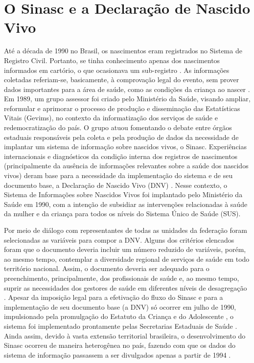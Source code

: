 \section{O Sinasc e a Declaração de Nascido Vivo}

Até a década de 1990 no Brasil, os nascimentos eram registrados no Sistema de Registro Civil. Portanto, se tinha conhecimento apenas dos nascimentos informados em cartório, o que ocasionava um sub-registro \cite{silvestrin2018avaliaccao}. As informações coletadas referiam-se, basicamente, à comprovação legal do evento, sem prover dados importantes para a área de saúde, como as condições da criança ao nascer \cite{szwarcwald2019evaluation}. Em 1989, um grupo assessor foi criado pelo Ministério da Saúde, visando ampliar, reformular e aprimorar o processo de produção e disseminação das Estatísticas Vitais (Gevims), no contexto da informatização dos serviços de saúde e redemocratização do país. O grupo atuou fomentando o debate entre órgãos estaduais responsáveis pela coleta e pela produção de dados da necessidade de implantar um sistema de informação sobre nascidos vivos, o Sinasc. Experiências internacionais e diagnósticos da condição interna dos registros de nascimentos (principalmente da ausência de informações relevantes sobre a saúde dos nascidos vivos) deram base para a necessidade da implementação do sistema e de seu documento base, a Declaração de Nascido Vivo (DNV) \cite{MSsinasc2009}. Nesse contexto, o Sistema de Informações sobre Nascidos Vivos foi implantado pelo Ministério da Saúde em 1990, com a intenção de subsidiar as intervenções relacionadas à saúde da mulher e da criança para todos os níveis do Sistema Único de Saúde (SUS). 

Por meio de diálogo com representantes de todas as unidades da federação foram selecionadas as variáveis para compor a DNV. Alguns dos critérios elencados foram que o documento deveria incluir um número reduzido de variáveis, porém, ao mesmo tempo, contemplar a diversidade regional de serviços de saúde em todo território nacional. Assim, o documento deveria ser adequado para o preenchimento, principalmente, dos profissionais de saúde e, ao mesmo tempo, suprir as necessidades dos gestores de saúde em diferentes níveis de desagregação \cite{MSsinasc2009}. Apesar da imposição legal para a efetivação do fluxo do Sinasc e para a implementação de seu documento base (a DNV) só ocorrer em julho de 1990, impulsionado pela promulgação do Estatuto da Criança e do Adolescente \cite{Lei:8.069:1990}, o sistema foi implementado prontamente pelas Secretarias Estaduais de Saúde \cite{BRMSlegislacao2009}. Ainda assim, devido à vasta extensão territorial brasileira, o desenvolvimento do Sinasc ocorreu de maneira heterogênea no país, fazendo com que os dados do sistema de informação passassem a ser divulgados apenas a partir de 1994 \cite{silvestrin2018avaliaccao}.

